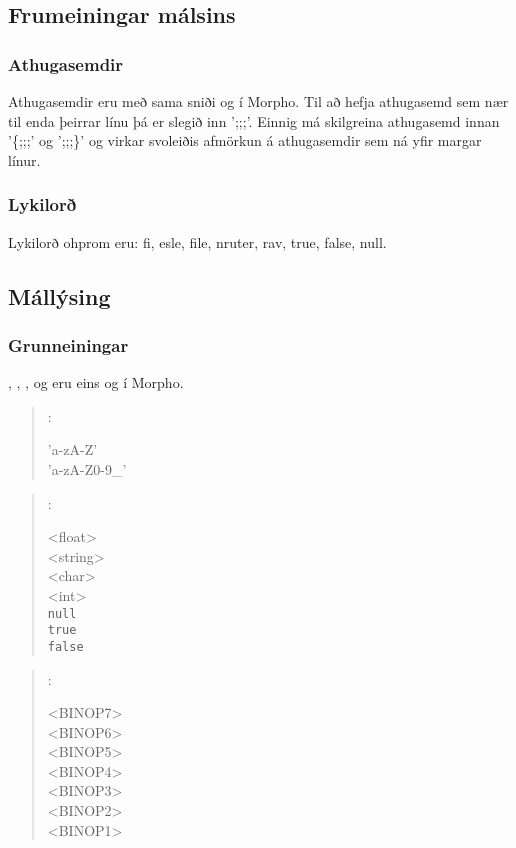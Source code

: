\documentclass[12pt,a4paper]{article}
\newenvironment{malrit}[1]{%
	\par\noindent\begin{minipage}{\linewidth}\vspace{0.5em}\begin{quote}\noindent%
	\hspace*{-2em}\synt{#1}:\hfill\par%
	\noindent%
	\begin{minipage}{\linewidth}\begin{syntdiag}%
}{%
	\end{syntdiag}\end{minipage}\end{quote}\end{minipage}%
}
\begin{document}
\subsection{Frumeiningar málsins}
\subsubsection{Athugasemdir}
Athugasemdir eru með sama sniði og í Morpho. Til að hefja athugasemd sem nær til enda þeirrar línu þá er slegið inn ';;;'. Einnig má skilgreina athugasemd innan '\{;;;' og ';;;\}' og virkar svoleiðis afmörkun á athugasemdir sem ná yfir margar línur.
\subsubsection{Lykilorð}
Lykilorð ohprom eru: fi, esle, file, nruter, rav, true, false, null.
\subsection{Mállýsing}
\subsubsection{Grunneiningar}
, , ,  og  eru eins og í Morpho.

\begin{malrit}{name}
	\begin{rep}[b]
		'a-zA-Z'
		\\'a-zA-Z0-9_'
	\end{rep}
\end{malrit}

\begin{malrit}{literal}
	\begin{stack}
		<float>
		\\<string>
		\\<char>
		\\<int>
		\\{\tt null}
		\\{\tt true}
		\\{\tt false}
	\end{stack}
\end{malrit}

\begin{malrit}{op}
	\begin{stack}
		{<BINOP7>}
		\\{<BINOP6>}
		\\{<BINOP5>}
		\\{<BINOP4>}
		\\{<BINOP3>}
		\\{<BINOP2>}
		\\{<BINOP1>}
	\end{stack}
\end{malrit}
\end{document}
